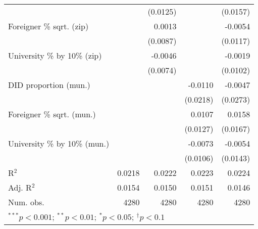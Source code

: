 \begin{tabular}{l D{.}{.}{4.7} D{.}{.}{4.7} D{.}{.}{4.7} D{.}{.}{4.7}}
                                  &               & (0.0125)      &               & (0.0157)      \\
Foreigner \% sqrt. (zip)          &               & 0.0013        &               & -0.0054       \\
                                  &               & (0.0087)      &               & (0.0117)      \\
University \% by 10\% (zip)       &               & -0.0046       &               & -0.0019       \\
                                  &               & (0.0074)      &               & (0.0102)      \\
DID proportion (mun.)             &               &               & -0.0110       & -0.0047       \\
                                  &               &               & (0.0218)      & (0.0273)      \\
Foreigner \% sqrt. (mun.)         &               &               & 0.0107        & 0.0158        \\
                                  &               &               & (0.0127)      & (0.0167)      \\
University \% by 10\% (mun.)      &               &               & -0.0073       & -0.0054       \\
                                  &               &               & (0.0106)      & (0.0143)      \\
\midrule
R$^2$                             & 0.0218        & 0.0222        & 0.0223        & 0.0224        \\
Adj. R$^2$                        & 0.0154        & 0.0150        & 0.0151        & 0.0146        \\
Num. obs.                         & 4280          & 4280          & 4280          & 4280          \\
\bottomrule
{}
\end{tabular}
